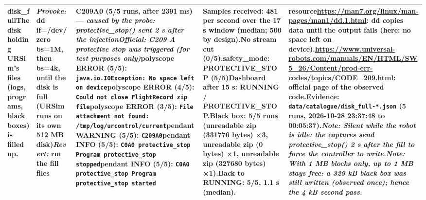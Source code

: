 \documentclass[10pt]{article}
\begin{document}
\begin{longtable}{@{}>{\raggedright\arraybackslash}p{2.7cm}>{\raggedright\arraybackslash}p{4.0cm}>{\raggedright\arraybackslash}p{7.6cm}>{\raggedright\arraybackslash}p{5.2cm}>{\raggedright\arraybackslash}p{6.0cm}@{}}
\textbf{disk\_\allowbreak{}full}\newline The disk holding URSim's files (logs,\allowbreak{} programs,\allowbreak{} black boxes) is filled up. & \textit{Provoke:} dd if=/dev/zero bs=1M,\allowbreak{} then bs=4k,\allowbreak{} until the disk is full (URSim runs on its own 512 MB disk)\newline\textit{Revert:} rm the fill files & \textbf{C209A0} (5/5 runs, after 2391 ms) --- \textit{caused by the probe: protective\_\allowbreak{}stop() sent 2 s after the injection}\newline \textit{Official: C209 A protective stop was triggered (for test purposes only)}\newline \textsf{polyscope} ERROR (5/5): \texttt{java.io.IOException: No space left on device}\newline \textsf{polyscope} ERROR (4/5): \texttt{Could not close FlightRecord zip file}\newline \textsf{polyscope} ERROR (3/5): \texttt{File attachment not found: /tmp/log/urcontrol/current}\newline \textsf{pendant} WARNING (5/5): \texttt{C209A0}\newline \textsf{pendant} INFO (5/5): \texttt{C0A0 protective\_\allowbreak{}stop Program protective\_\allowbreak{}stop stopped}\newline \textsf{pendant} INFO (5/5): \texttt{C0A0 protective\_\allowbreak{}stop Program protective\_\allowbreak{}stop started} & Samples received: 481 per second over the 17 s window (median; 500 by design).\newline No stream cut (0/5).\newline safety\_\allowbreak{}mode: PROTECTIVE\_\allowbreak{}STOP (5/5)\newline Dashboard after 15 s: RUNNING / PROTECTIVE\_\allowbreak{}STOP.\newline Black box: 5/5 runs (unreadable zip (331776 bytes) ×3, unreadable zip (0 bytes) ×1, unreadable zip (327680 bytes) ×1).\newline Back to RUNNING: 5/5, 1.1 s (median). & \textbf{resource}\newline \url{https://man7.org/linux/man-pages/man1/dd.1.html}: dd copies data until the output fails (here: no space left on device).\newline \url{https://www.universal-robots.com/manuals/EN/HTML/SW5_26/Content/prod-err-codes/topics/CODE_209.html}: official page of the observed code.\newline Evidence: \texttt{data/catalogue/disk\_\allowbreak{}full-*.json} (5 runs, 2026-10-28 23:37:48 to 00:05:37).\newline \textit{Note: Silent while the robot is idle: the captures send protective\_\allowbreak{}stop() 2 s after the fill to force the controller to write.}\newline \textit{Note: With 1 MB blocks only,\allowbreak{} up to 1 MB stays free: a 329 kB black box was still written (observed once); hence the 4 kB second pass.} \\ \midrule
\end{longtable}
\end{document}

